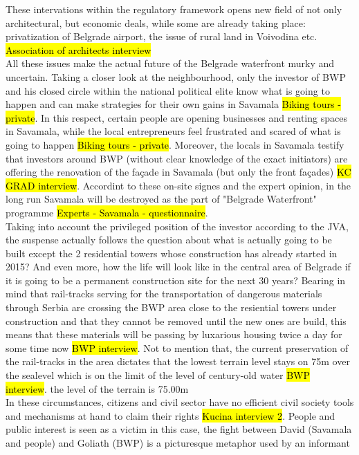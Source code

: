 \documentclass[11pt]{report}
\begin{document}
These intervations within the regulatory framework opens new field of not only architectural, but economic deals, while some are already taking place: privatization of Belgrade airport, the issue of rural land in Voivodina  etc. \hl{Association of architects interview}
\\
All these issues make the actual future of the Belgrade waterfront murky and uncertain.
Taking a closer look at the neighbourhood, only the investor of BWP and his closed circle within the national political elite know what is going to happen and can make strategies for their own gains in Savamala \hl{Biking tours - private}. 
In this respect, certain people are opening businesses and renting spaces in Savamala, while the local entrepreneurs feel frustrated and scared of what is going to happen \hl{Biking tours - private}.
Moreover, the locals in Savamala testify that investors around BWP (without clear knowledge of the exact initiators) are offering the renovation of the façade in Savamala (but only the front façades) \hl{KC GRAD interview}.
Accordint to these on-site signes and the expert opinion, in the long run Savamala will be destroyed as the part of "Belgrade Waterfront" programme \hl{Experts - Savamala - questionnaire}.
\\
Taking into account the privileged position of the investor according to the JVA, the suspense actually follows the question about what is actually going to be built except the 2 residential towers whose construction has already started in 2015?
And even more, how the life will look like in the central area of Belgrade if it is going to be a permanent construction site for the next 30 years?
Bearing in mind that rail-tracks serving for the transportation of dangerous materials through Serbia are crossing the BWP area close to the resiential towers under construction and that they cannot be removed until the new ones are build\footnotemark, this means that these materials will be passing by luxarious housing twice a day for some time now \hl{BWP interview}.
Not to mention that, the current preservation of the rail-tracks in the area dictates that the lowest terrain level stays on 75m over the sealevel which is on the limit of the level of century-old water \hl{BWP interview}.
the level of the terrain is 75.00m
\\
In these circumstances, citizens and civil sector have no efficient civil society tools and mechanisms at hand to claim their rights \hl{Kucina interview 2}. People and public interest is seen as a victim in this case, the fight between David (Savamala and people) and Goliath (BWP) is a picturesque metaphor used by an informant
\end{document}
